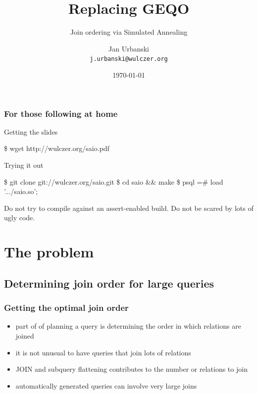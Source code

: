 \documentclass{beamer}
\title{Replacing GEQO}
\subtitle{Join ordering via Simulated Annealing}
\author{Jan Urbanski \\ \texttt{j.urbanski@wulczer.org}}
\institute{University of Warsaw / Flumotion}
\date{\today}
\begin{document}
\frame{\titlepage}

\begin{frame}[fragile]
  \frametitle{For those following at home}

  \begin{block}{Getting the slides}
    \begin{semiverbatim}
      \$ wget http://wulczer.org/saio.pdf
    \end{semiverbatim}
  \end{block}

  \begin{block}{Trying it out}
    \begin{semiverbatim}
      \$ git clone git://wulczer.org/saio.git
      \$ cd saio && make
      \$ psql
      =# load '.../saio.so';
    \end{semiverbatim}
  \end{block}

  Do not try to compile against an assert-enabled build. Do not be scared by
  lots of ugly code.
\end{frame}

\begin{frame}
  \tableofcontents
\end{frame}

\section{The problem}
\subsection{Determining join order for large queries}

\begin{frame}
  \frametitle{Getting the optimal join order}

  \begin{itemize}
  \item part of of planning a query is determining the order in which relations
    are joined
  \item it is not unusual to have queries that join lots of relations
  \item JOIN and subquery flattening contributes to the number or relations to
    join
  \item automatically generated queries can involve very large joins
  \end{itemize}
\end{frame}
\end{document}
